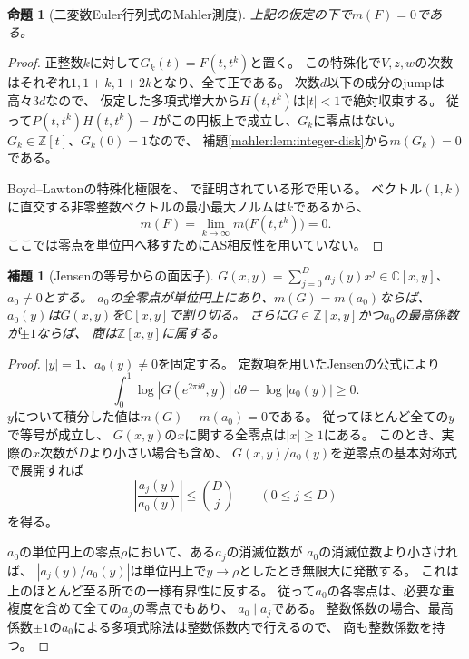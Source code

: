 \documentclass[11pt,a4paper]{ltjsarticle}
\newtheorem{proposition}[theorem]{命題}
\newtheorem{lemma}[theorem]{補題}
\theoremstyle{definition}
\begin{document}
\begin{proposition}[二変数Euler行列式のMahler測度]
\label{mahler:prop:euler-measure}
上記の仮定の下で$m(F)=0$である。
\end{proposition}
\begin{proof}
正整数$k$に対して$G_k(t)=F(t,t^k)$と置く。
この特殊化で$V,z,w$の次数はそれぞれ$1,1+k,1+2k$となり、全て正である。
次数$d$以下の成分のjumpは高々$3d$なので、
仮定した多項式増大から$H(t,t^k)$は$|t|<1$で絶対収束する。
従って$P(t,t^k)H(t,t^k)=I$がこの円板上で成立し、$G_k$に零点はない。
$G_k\in\mathbb Z[t]$、$G_k(0)=1$なので、
補題\ref{mahler:lem:integer-disk}から$m(G_k)=0$である。

Boyd--Lawtonの特殊化極限を、
\cite[Theorem~1.2, $s=1$]{IssaLalin2013}で証明されている形で用いる。
ベクトル$(1,k)$に直交する非零整数ベクトルの最小最大ノルムは$k$であるから、
\[
 m(F)=\lim_{k\to\infty}m\bigl(F(t,t^k)\bigr)=0.
\]
ここでは零点を単位円へ移すためにAS相反性を用いていない。
\end{proof}

\begin{lemma}[Jensenの等号からの面因子]
\label{mahler:lem:face-divides}
$G(x,y)=\sum_{j=0}^{D}a_j(y)x^j\in\mathbb C[x,y]$、$a_0\ne0$とする。
$a_0$の全零点が単位円上にあり、$m(G)=m(a_0)$ならば、
$a_0(y)$は$G(x,y)$を$\mathbb C[x,y]$で割り切る。
さらに$G\in\mathbb Z[x,y]$かつ$a_0$の最高係数が$\pm1$ならば、
商は$\mathbb Z[x,y]$に属する。
\end{lemma}
\begin{proof}
$|y|=1$、$a_0(y)\ne0$を固定する。
定数項を用いたJensenの公式により
\[
 \int_0^1\log|G(e^{2\pi i\theta},y)|\,d\theta
       -\log|a_0(y)|\ge0.
\]
$y$について積分した値は$m(G)-m(a_0)=0$である。
従ってほとんど全ての$y$で等号が成立し、
$G(x,y)$の$x$に関する全零点は$|x|\ge1$にある。
このとき、実際の$x$次数が$D$より小さい場合も含め、
$G(x,y)/a_0(y)$を逆零点の基本対称式で展開すれば
\[
 \left|\frac{a_j(y)}{a_0(y)}\right|\le\binom Dj
 \qquad(0\le j\le D)
\]
を得る。

$a_0$の単位円上の零点$\rho$において、ある$a_j$の消滅位数が
$a_0$の消滅位数より小さければ、
$|a_j(y)/a_0(y)|$は単位円上で$y\to\rho$としたとき無限大に発散する。
これは上のほとんど至る所での一様有界性に反する。
従って$a_0$の各零点は、必要な重複度を含めて全ての$a_j$の零点でもあり、
$a_0\mid a_j$である。
整数係数の場合、最高係数$\pm1$の$a_0$による多項式除法は整数係数内で行えるので、
商も整数係数を持つ。
\end{proof}
\end{document}
